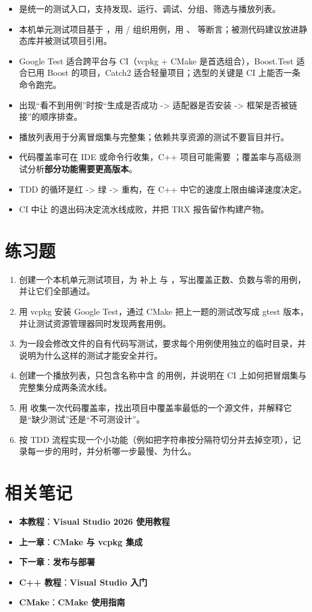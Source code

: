 \begin{itemize}
  \item {} 是统一的测试入口，支持发现、运行、调试、分组、筛选与播放列表。
  \item 本机单元测试项目基于 ，用  /  组织用例，用 、 等断言；被测代码建议放进静态库并被测试项目引用。
  \item Google Test 适合跨平台与 CI（vcpkg + CMake 是首选组合），Boost.Test 适合已用 Boost 的项目，Catch2 适合轻量项目；选型的关键是 CI 上能否一条命令跑完。
  \item 出现“看不到用例”时按“生成是否成功 -> 适配器是否安装 -> 框架是否被链接”的顺序排查。
  \item 播放列表用于分离冒烟集与完整集；依赖共享资源的测试不要盲目并行。
  \item 代码覆盖率可在 IDE 或命令行收集，C++ 项目可能需要 ；覆盖率与高级测试分析\textbf{部分功能需要更高版本}。
  \item TDD 的循环是红 -> 绿 -> 重构，在 C++ 中它的速度上限由编译速度决定。
  \item CI 中让  的退出码决定流水线成败，并把 TRX 报告留作构建产物。
\end{itemize}

\section{练习题}

\begin{enumerate}
  \item 创建一个本机单元测试项目，为  补上  与 ，写出覆盖正数、负数与零的用例，并让它们全部通过。
  \item 用 vcpkg 安装 Google Test，通过 CMake 把上一题的测试改写成 gtest 版本，并让测试资源管理器同时发现两套用例。
  \item 为一段会修改文件的自有代码写测试，要求每个用例使用独立的临时目录，并说明为什么这样的测试才能安全并行。
  \item 创建一个播放列表，只包含名称中含  的用例，并说明在 CI 上如何把冒烟集与完整集分成两条流水线。
  \item 用  收集一次代码覆盖率，找出项目中覆盖率最低的一个源文件，并解释它是“缺少测试”还是“不可测设计”。
  \item 按 TDD 流程实现一个小功能（例如把字符串按分隔符切分并去掉空项），记录每一步的用时，并分析哪一步最慢、为什么。
\end{enumerate}

\section{相关笔记}

\begin{itemize}
  \item \textbf{本教程}：\textbf{Visual Studio 2026 使用教程}
  \item \textbf{上一章}：\textbf{CMake 与 vcpkg 集成}
  \item \textbf{下一章}：\textbf{发布与部署}
  \item \textbf{C++ 教程}：\textbf{Visual Studio 入门}
  \item \textbf{CMake}：\textbf{CMake 使用指南}
\end{itemize}
